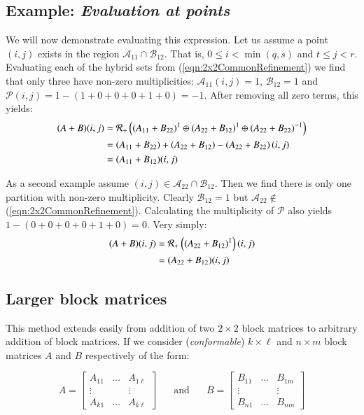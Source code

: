 
\subsection{Example: \emph{Evaluation at points}} 
We will now demonstrate evaluating this expression.
Let us assume a point $(i,j)$ exists in the region $\mathcal{A}_{11} \cap \mathcal{B}_{12}$.
That is, $0 \leq i < \min(q,s)$ and $t \leq j < r$. 
Evaluating each of the hybrid sets from (\ref{eqn:2x2CommonRefinement}) we find that only three have 
non-zero multiplicities: $\mathcal{A}_{11}(i,j)=1$, $\mathcal{B}_{12}=1$ and 
$\mathcal{P}(i,j)=1-(1+0+0+0+1+0)=-1$.
After removing all zero terms, this yields:
\begin{align*}
	(A+B)(i,j) &= \R[+]  \left(  (A_{11}+B_{22})^{1} \oplus 
		(A_{22} + B_{12})^{1} \oplus 
		(A_{22} + B_{22})^{-1} \right)\\
		&= \left(A_{11}+B_{22}) + (A_{22} + B_{12}) - (A_{22} + B_{22}\right)(i,j)\\
		&= (A_{11}+B_{12})(i,j)
\end{align*}

As a second example assume $(i,j) \in \mathcal{A}_{22} \cap \mathcal{B}_{12}$.
Then we find there is only one partition with non-zero multiplicity.
Clearly $\mathcal{B}_{12} = 1$ but $\mathcal{A}_{22} \notin$(\ref{eqn:2x2CommonRefinement}).
Calculating the multiplicity of $\mathcal{P}$ also yields $1-(0+0+0+0+1+0) = 0$.
Very simply:
\begin{align*}
	(A+B)(i,j) &= \R[+]  \left(  (A_{22}+B_{12})^{1} \right)(i,j)\\
		&=(A_{22}+B_{12})(i,j)
\end{align*}


\subsection{Larger block matrices}
This method extends easily from addition of two $2\times 2$ block matrices to arbitrary addition of block matrices.
If we consider (\emph{conformable}) $k \times \ell$ and $n \times m$ block matrices $A$ and $B$ respectively of the form:

\begin{equation*}
	A = \begin{bmatrix}
		A_{11} & \ldots & A_{1\ell}\\
		\vdots & & \vdots \\
		A_{k1} & \ldots & A_{k\ell}	
	\end{bmatrix}
	\;\;\;\;\;
	\text{ and }
	\;\;\;\;\;
	B = \begin{bmatrix}
		B_{11} & \ldots & B_{1m}\\
		\vdots & & \vdots \\
		B_{n1} & \ldots & B_{nm}	
	\end{bmatrix}
\end{equation*}

